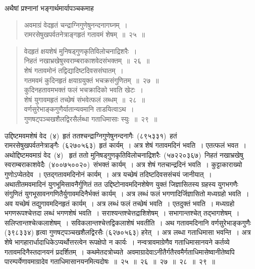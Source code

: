 \documentclass[11pt, openany]{book}
\begin{document}
\indent
अथैषां प्रश्नानां भङ्गार्थमार्यापञ्चकमाह\textendash
\begin{quote}
{\ks अवमाग्रं वेदहृतं चन्द्राग्निगुणेषुनन्दनागघ्नम्~।\\
रामरसेषुखपर्वतनेत्राङ्गहृतं गतावमं शेषम्~॥~२५~॥}
\end{quote}

\newpage
\thispagestyle{fancy}
\fancyhf{}

\begin{quote}
{\ks वेदहृतं क्षयशेषं मुनिषड्गुणकृतिविलोचनाद्रिशरैः~।\\
निहतं नखाभ्रखेषुस्वराम्बराकाशवेदसंभक्तम्~॥~२६~॥\\
शेषं गतावमोनं तद्विद्यादिष्टदिवससंघातम्~।\\
गतमवमं कुदिनहृतं क्षयाग्रयुक्तं भचक्रसंगुणितम्~॥~२७~॥\\
कुदिनहतावमभक्तं फलं भचक्रादिको भवति खेटः~।\\
शेषं युगावमहृतं तच्छेषं संभवेत्फलं लब्धम्~॥~२८~॥\\
वर्णसुरेभाङ्कगुणैर्यातान्यवमानि ताडयित्वाऽथ~।\\
गुणषट्पञ्चखशैलद्विरसैर्लब्धा गताधिमासाः स्युः~॥~२९~॥}
\end{quote}

\indent
उद्दिष्टमवमशेषं वेद~(४)~हृतं ततश्चन्द्राग्निगुणेषुनन्दनागैः~(८९५३३१)~हतं रामरसेषुखपर्वतनेत्राङ्गैः~(६२७०५६३)~हृतं कार्यम्~। अत्र शेषं गतावमदिनं भवति~। एतत्फलं भवत~। अथोद्दिष्टमवमाग्रं वेद~(४)~ हृतं ततो मुनिषड्गुणकृतिविलोचनाद्रिशरैः~(५७२२०३६७)~निहतं नखाभ्रखेषु स्वराम्बराकाशवेदैः~(४००७५००२०)~संभक्तं कार्यम्~। अत्र शेषं गतचान्द्रदिनं भवति~। कुट्टाकाराख्यो गुणोऽप्येतदेव~। एतद्गतावमदिनोनं कार्यम्~। अत्र यच्छेषं तदिष्टदिवससंचयं जानीयात्~। अथातीतमवमादिनं युगभूमिसावनैर्गुणितं तत उद्दिष्टोनावमदिनशेषेण युक्तं जिज्ञासितस्य ग्रहस्य युगभगणैः
संगुणितं युगभूसावनगणितैर्युगावमदिनैर्भक्तं कार्यम्~। अत्र लब्धं फलं भगणादिर्जिज्ञासितो मध्यग्रहो भवति~। अव यच्छेषं तद्युगावमदिनहृतं कार्यम्~। अत्र लब्धं फलं तच्छेषं भवति~। एतदुक्तं भवति~। मध्यग्रहो भगणरूपश्चेत्तदा लब्धं भगणशेषं भवति~। सराश्यन्तश्चेत्तद्राशिशेषम्~। सभागान्तश्चेत् तद्भागशेषम्~। सलिप्तान्तश्चेत्कलाशेषम्~। सविकलान्तश्चेत्तद्विकलाशेषं भवतीति~। अथ गतावमदिनानि वर्णसुरेभाङ्कगुणैः (३९८३३४) हृत्वा गुणषट्पञ्चखशैलद्विरसैः (६२७०५६३) हरेत्~। अत्र लब्धा गताधिमासा
भवन्ति~। अत्र शेषे भागहारार्धादाधिकेऽप्यर्थोत्तरत्वेन रूपक्षेपो न कार्यः~। नन्वत्रावमाग्रेणैव गताधिमासानयने कर्तव्ये गतावमदिनैस्तदानयनं प्रदर्शितम्~।
कथमेतदत्रोच्यते\textendash\ अवमाग्रादेवाऽनीतैर्गतैरवमैर्गताधिमासेष्वानीतेष्वपि पारम्पर्येणावमाग्रादेव गताधिमासानयनमित्यदोषः~॥~२५~॥~२६~॥~२७~॥~२८~॥~२९~॥
\end{document}
